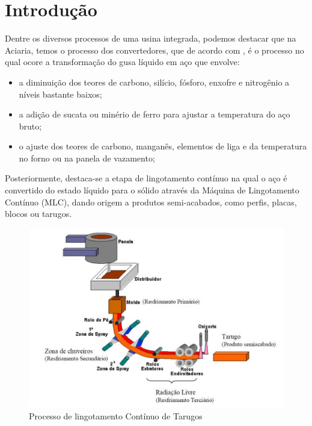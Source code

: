 \chapter[Introdução]{Introdução}
 Dentre os diversos processos de uma usina integrada, podemos destacar que na Aciaria, temos o processo dos convertedores, que de acordo com \cite{machado2003siderurgia}, é o processo no qual ocore a transformação do gusa líquido em aço que envolve:

\begin{itemize}
	\item a diminuição dos teores de carbono, silício, fósforo, enxofre e nitrogênio a níveis bastante baixos;
	\item a adição de sucata ou minério de ferro para ajustar a temperatura do aço bruto;
	\item o ajuste dos teores de carbono, manganês, elementos de liga e da temperatura no forno ou na panela de vazamento;
\end{itemize}

Posteriormente, destaca-se a etapa de lingotamento contínuo na qual o aço é convertido do estado líquido para o sólido através da Máquina de Lingotamento Contínuo (MLC), dando origem a produtos semi-acabados, como perfis, placas, blocos ou tarugos.

\begin{figure}[htbp]
	\centering
	\includegraphics[width=0.8\linewidth]{figuras/Steel/artigo_2.png}
	\caption{Processo de lingotamento Contínuo de Tarugos}
	\label{fig:processLing}
\end{figure}

